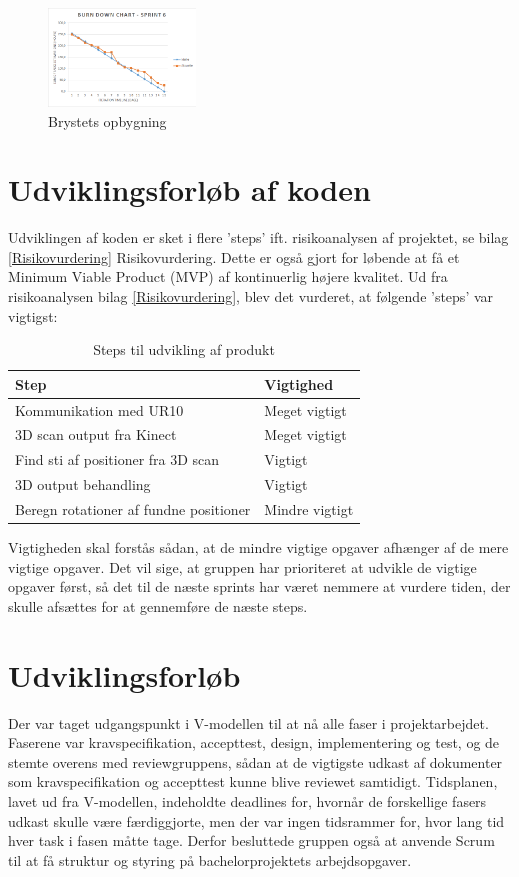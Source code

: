 \begin{figure}[H]
    \centering
    \includegraphics[width=0.35\textwidth]{figurer/d/Burn-down}
    \caption{Brystets opbygning \citep{Burn-down}}
    \label{Burn-down chart for sprint 6}
\end{figure}

\newpage

\section{Udviklingsforløb af koden}
Udviklingen af koden er sket i flere 'steps' ift. risikoanalysen af projektet, se bilag \ref{Risikovurdering} Risikovurdering. Dette er også gjort for løbende at få et Minimum Viable Product (MVP) af kontinuerlig højere kvalitet. 
Ud fra risikoanalysen bilag \ref{Risikovurdering}, blev det vurderet, at følgende 'steps' var vigtigst:

\begin{table}[h]
\centering
\begin{tabular}{|l| p{}|}
\hline
\textbf{Step} &  \textbf{Vigtighed} \\\hline
	Kommunikation med UR10 & Meget vigtigt \\\hline
	3D scan output fra Kinect & Meget vigtigt\\\hline
	Find sti af positioner fra 3D scan & Vigtigt \\\hline
	3D output behandling & Vigtigt \\\hline
	Beregn rotationer af fundne positioner & Mindre vigtigt \\\hline
\end{tabular}
\caption{Steps til udvikling af produkt}
\end{table}

Vigtigheden skal forstås sådan, at de mindre vigtige opgaver afhænger af de mere vigtige opgaver. 
Det vil sige, at gruppen har prioriteret at udvikle de vigtige opgaver først, så det til de næste sprints har været nemmere at vurdere tiden, der skulle afsættes for at gennemføre de næste steps.
 
\section{Udviklingsforløb} \label{Udviklingsforlob}
Der var taget udgangspunkt i V-modellen til at nå alle faser i projektarbejdet. Faserene var kravspecifikation, accepttest, design, implementering og test, og de stemte overens med reviewgruppens, sådan at de vigtigste udkast af dokumenter som kravspecifikation og accepttest kunne blive reviewet samtidigt. Tidsplanen, lavet ud fra V-modellen, indeholdte deadlines for, hvornår de forskellige fasers udkast skulle være færdiggjorte, men der var ingen tidsrammer for, hvor lang tid hver task i fasen måtte tage. Derfor besluttede gruppen også at anvende Scrum til at få struktur og styring på bachelorprojektets arbejdsopgaver.


